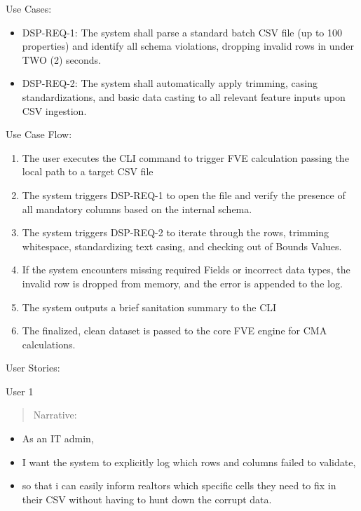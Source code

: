 \documentclass[
]{article}
\begin{document}
Use Cases:

\begin{itemize}
\item
  DSP-REQ-1: The system shall parse a standard batch CSV file (up to 100
  properties) and identify all schema violations, dropping invalid rows
  in under TWO (2) seconds.
\item
  DSP-REQ-2: The system shall automatically apply trimming, casing
  standardizations, and basic data casting to all relevant feature
  inputs upon CSV ingestion.
\end{itemize}

Use Case Flow:

\begin{enumerate}
\def\labelenumi{\arabic{enumi})}
\item
  The user executes the CLI command to trigger FVE calculation passing
  the local path to a target CSV file
\item
  The system triggers DSP-REQ-1 to open the file and verify the presence
  of all mandatory columns based on the internal schema.
\item
  The system triggers DSP-REQ-2 to iterate through the rows, trimming
  whitespace, standardizing text casing, and checking out of Bounds
  Values.
\item
  If the system encounters missing required Fields or incorrect data
  types, the invalid row is dropped from memory, and the error is
  appended to the log.
\item
  The system outputs a brief sanitation summary to the CLI
\item
  The finalized, clean dataset is passed to the core FVE engine for CMA
  calculations.
\end{enumerate}

User Stories:

User 1

\begin{quote}
Narrative:
\end{quote}

\begin{itemize}
\item
  As an IT admin,
\item
  I want the system to explicitly log which rows and columns failed to
  validate,
\item
  so that i can easily inform realtors which specific cells they need to
  fix in their CSV without having to hunt down the corrupt data.
\end{itemize}
\end{document}
